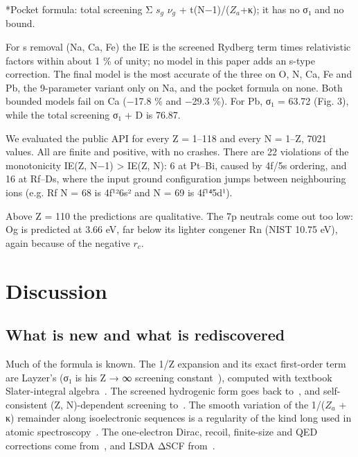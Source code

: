 \documentclass[aps,pra,preprint,notitlepage,superscriptaddress,amsmath,amssymb]{revtex4-2}
\begin{document}
*Pocket formula: total screening Σ $s_{g}$ $ν_{g}$ + t(N−1)/($Z_{a}$+κ); it has no σ₁ and no bound.


For s removal (Na, Ca, Fe) the IE is the screened Rydberg term times relativistic factors within about 1 \% of unity; no model in this paper adds an s-type correction. The final model is the most accurate of the three on O, N, Ca, Fe and Pb, the 9-parameter variant only on Na, and the pocket formula on none. Both bounded models fail on Ca (−17.8 \% and −29.3 \%). For Pb, σ₁ = 63.72 (Fig. 3), while the total screening σ₁ + D is 76.87.


We evaluated the public API for every Z = 1–118 and every N = 1–Z, 7021 values. All are finite and positive, with no crashes. There are 22 violations of the monotonicity IE(Z, N−1) > IE(Z, N): 6 at Pt–Bi, caused by 4f/5s ordering, and 16 at Rf–Ds, where the input ground configuration jumps between neighbouring ions (e.g. Rf N = 68 is 4f¹²6s² and N = 69 is 4f¹⁴5d¹).


Above Z = 110 the predictions are qualitative. The 7p neutrals come out too low: Og is predicted at 3.66 eV, far below its lighter congener Rn (NIST 10.75 eV), again because of the negative $r_{c}$.


\section{Discussion}

\subsection{What is new and what is rediscovered}

Much of the formula is known. The 1/Z expansion and its exact first-order term are Layzer's (σ₁ is his Z → ∞ screening constant~\cite{r4}), computed with textbook Slater-integral algebra~\cite{r32,r33}. The screened hydrogenic form goes back to~\cite{r1,r10,r11}, and self-consistent (Z, N)-dependent screening to~\cite{r17,r19}. The smooth variation of the 1/($Z_{a}$ + κ) remainder along isoelectronic sequences is a regularity of the kind long used in atomic spectroscopy~\cite{r8}. The one-electron Dirac, recoil, finite-size and QED corrections come from~\cite{r30,r31}, and LSDA ΔSCF from~\cite{r26,r27}.
\end{document}
